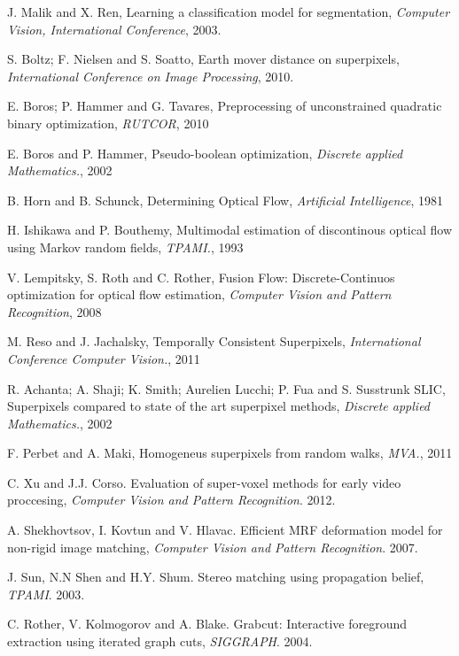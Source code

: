\begin{thebibliography}{99}

J. Malik and X. Ren, Learning a classification model for segmentation, {\it Computer Vision, International Conference}, 2003.

S. Boltz; F. Nielsen and S. Soatto, Earth mover distance on superpixels, {\it International Conference on Image Processing}, 2010.

E. Boros; P. Hammer and G. Tavares, Preprocessing of unconstrained quadratic binary optimization, {\it RUTCOR}, 2010

E. Boros and P. Hammer, Pseudo-boolean optimization, {\it Discrete applied Mathematics.}, 2002

B. Horn and B. Schunck, Determining Optical Flow, {\it Artificial Intelligence}, 1981

H. Ishikawa and P. Bouthemy, Multimodal estimation of discontinous optical flow using Markov random fields, {\it TPAMI.}, 1993

V. Lempitsky, S. Roth and C. Rother, Fusion Flow: Discrete-Continuos optimization for optical flow estimation, {\it Computer Vision and Pattern Recognition}, 2008

M. Reso and J. Jachalsky, Temporally Consistent Superpixels, {\it International Conference Computer Vision.}, 2011

R. Achanta; A. Shaji; K. Smith; Aurelien Lucchi; P. Fua and S. Susstrunk SLIC, Superpixels compared to state of the art superpixel methods, {\it Discrete applied Mathematics.}, 2002

F. Perbet and A. Maki, Homogeneus superpixels from random walks, {\it MVA.}, 2011

C. Xu and J.J. Corso. Evaluation of super-voxel methods for early video proccesing, {\it Computer Vision and Pattern Recognition}. 2012.

A. Shekhovtsov, I. Kovtun and V. Hlavac. Efficient MRF deformation model for non-rigid image matching, {\it Computer Vision and Pattern Recognition}. 2007.

J. Sun, N.N Shen and H.Y. Shum. Stereo matching using propagation belief, {\it TPAMI}. 2003.

C. Rother, V. Kolmogorov and A. Blake. Grabcut: Interactive foreground extraction using iterated graph cuts, {\it SIGGRAPH}. 2004.


\end{thebibliography}
